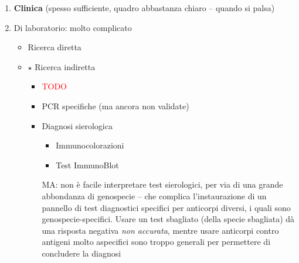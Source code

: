 \documentclass[italian,]{article}
\providecommand{\tightlist}{%
  \setlength{\itemsep}{0pt}\setlength{\parskip}{0pt}}
\newcommand{\goldstandard}{\textcircled{$\star$} }                      %
\newcommand{\TODO}[1]{\textcolor{red}{\textsf{\footnotesize{TODO #1}}}} %
\begin{document}
\begin{enumerate}
\def\labelenumi{\arabic{enumi}.}
\tightlist
\item
  \textbf{Clinica} (spesso sufficiente, quadro abbastanza chiaro --
  quando si palsa)
\item
  Di laboratorio: molto complicato

  \begin{itemize}
  \tightlist
  \item
    Ricerca diretta
  \item
    \goldstandard Ricerca indiretta

    \begin{itemize}
    \item
      \TODO{}
    \item
      PCR specifiche (ma ancora non validate)
    \item
      Diagnosi sierologica

      \begin{itemize}
      \tightlist
      \item
        Immunocolorazioni
      \item
        Test ImmunoBlot
      \end{itemize}

      MA: non è facile interpretare test sierologici, per via di una
      grande abbondanza di genospecie -- che complica l'instaurazione di
      un pannello di test diagnostici specifici per anticorpi diversi, i
      quali sono genospecie-specifici. Usare un test sbagliato (della
      specie sbagliata) dà una risposta negativa \emph{non accurata},
      mentre usare anticorpi contro antigeni molto aspecifici sono
      troppo generali per permettere di concludere la diagnosi
    \end{itemize}
  \end{itemize}
\end{enumerate}
\end{document}
